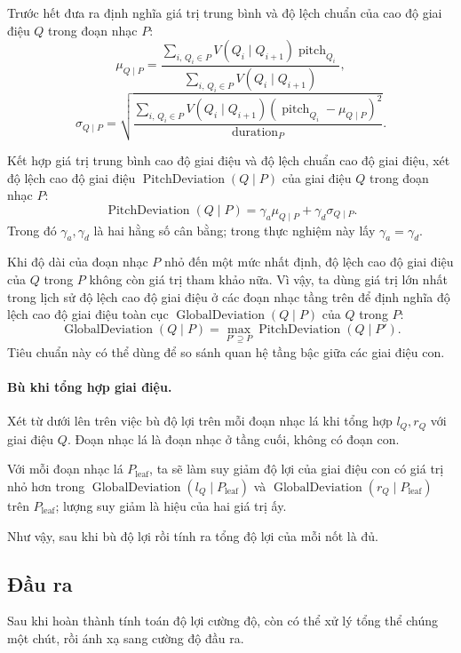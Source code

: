 \documentclass[11pt]{article}
\begin{document}
Trước hết đưa ra định nghĩa giá trị trung bình và độ lệch chuẩn của cao độ
giai điệu \(Q\) trong đoạn nhạc \(P\):
\[
  \mu_{Q\mid P}=
  \frac{\sum_{i,\,Q_i\in P}V(Q_i\mid Q_{i+1})\operatorname{pitch}_{Q_i}}
       {\sum_{i,\,Q_i\in P}V(Q_i\mid Q_{i+1})},
\]
\[
  \sigma_{Q\mid P}=
  \sqrt{
  \frac{\sum_{i,\,Q_i\in P}V(Q_i\mid Q_{i+1})
  (\operatorname{pitch}_{Q_i}-\mu_{Q\mid P})^2}
  {\operatorname{duration}_P}}.
\]

Kết hợp giá trị trung bình cao độ giai điệu và độ lệch chuẩn cao độ giai
điệu, xét độ lệch cao độ giai điệu
\(\operatorname{PitchDeviation}(Q\mid P)\) của giai điệu \(Q\) trong đoạn
nhạc \(P\):
\[
  \operatorname{PitchDeviation}(Q\mid P)=
  \gamma_a\mu_{Q\mid P}+\gamma_d\sigma_{Q\mid P}.
\]
Trong đó \(\gamma_a,\gamma_d\) là hai hằng số cân bằng; trong thực nghiệm này
lấy \(\gamma_a=\gamma_d\).

Khi độ dài của đoạn nhạc \(P\) nhỏ đến một mức nhất định, độ lệch cao độ giai
điệu của \(Q\) trong \(P\) không còn giá trị tham khảo nữa. Vì vậy, ta dùng
giá trị lớn nhất trong lịch sử độ lệch cao độ giai điệu ở các đoạn nhạc tầng
trên để định nghĩa độ lệch cao độ giai điệu toàn cục
\(\operatorname{GlobalDeviation}(Q\mid P)\) của \(Q\) trong \(P\):
\[
  \operatorname{GlobalDeviation}(Q\mid P)=
  \max_{P'\supseteq P}\operatorname{PitchDeviation}(Q\mid P').
\]
Tiêu chuẩn này có thể dùng để so sánh quan hệ tầng bậc giữa các giai điệu
con.

\paragraph{Bù khi tổng hợp giai điệu.}
Xét từ dưới lên trên việc bù độ lợi trên mỗi đoạn nhạc lá khi tổng hợp
\(l_Q,r_Q\) với giai điệu \(Q\). Đoạn nhạc lá là đoạn nhạc ở tầng cuối, không
có đoạn con.

Với mỗi đoạn nhạc lá \(P_{\operatorname{leaf}}\), ta sẽ làm suy giảm độ lợi
của giai điệu con có giá trị nhỏ hơn trong
\(\operatorname{GlobalDeviation}(l_Q\mid P_{\operatorname{leaf}})\) và
\(\operatorname{GlobalDeviation}(r_Q\mid P_{\operatorname{leaf}})\) trên
\(P_{\operatorname{leaf}}\); lượng suy giảm là hiệu của hai giá trị ấy.

Như vậy, sau khi bù độ lợi rồi tính ra tổng độ lợi của mỗi nốt là đủ.

\subsection{Đầu ra}

Sau khi hoàn thành tính toán độ lợi cường độ, còn có thể xử lý tổng thể chúng
một chút, rồi ánh xạ sang cường độ đầu ra.
\end{document}
